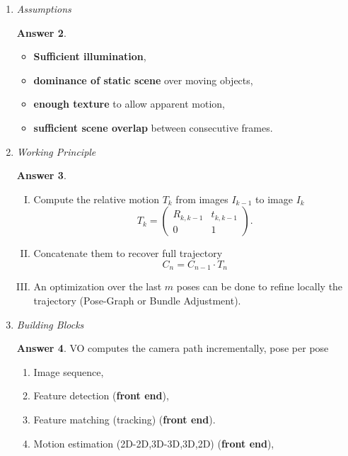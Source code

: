 \documentclass[a4paper,12 pt]{article}
\theoremstyle{definition}
\theoremstyle{remark}
\theoremstyle{definition}
\theoremstyle{definition}
\theoremstyle{definition}
\theoremstyle{definition}
\theoremstyle{remark}
\theoremstyle{remark}
\theoremstyle{definition}
\theoremstyle{definition}
\newtheorem*{answer}{Answer}
\begin{document}
\begin{enumerate}
\begin{enumerate}
\begin{answer}
\begin{itemize}
\item VO doesn't need to keep track of all previous history of the camera. Good for real-time.
\end{itemize}
\end{answer}
\item \textit{Assumptions}
\begin{answer}
\
\begin{itemize}
\item \textbf{Sufficient illumination},
\item \textbf{dominance of static scene} over moving objects,
\item \textbf{enough texture} to allow apparent motion,
\item \textbf{sufficient scene overlap} between consecutive frames.
\end{itemize}
\end{answer}
\item \textit{Working Principle}
\begin{answer}\
\begin{enumerate}[I)]
\item Compute the relative motion $T_k$ from images $I_{k-1}$ to image $I_k$
\begin{equation}
T_k=\begin{pmatrix}
R_{k,k-1}&t_{k,k-1}\\
0&1
\end{pmatrix}.
\end{equation}
\item Concatenate them to recover full trajectory
\begin{equation}
C_n=C_{n-1}\cdot T_n
\end{equation}
\item An optimization over the last $m$ poses can be done to refine locally the trajectory (Pose-Graph or Bundle Adjustment).
\end{enumerate}
\end{answer}
\item \textit{Building Blocks}
\begin{answer}
VO computes the camera path incrementally, pose per pose
\begin{enumerate}
\item Image sequence,
\item Feature detection (\textbf{front end}),
\item Feature matching (tracking) (\textbf{front end}).
\item Motion estimation (2D-2D,3D-3D,3D,2D) (\textbf{front end}),

\end{enumerate}
\end{answer}
\end{enumerate}
\end{enumerate}
\end{document}
